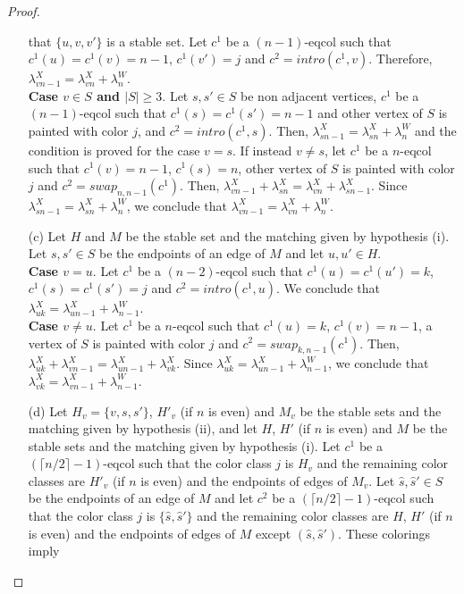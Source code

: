 \begin{proof}
\begin{enumerate}
that  $\{u, v, v'\}$ is a stable set. Let $c^1$ be a $(n-1)$-eqcol such that $c^1(u) = c^1(v) = n-1$, $c^1(v') = j$
and $c^2 = intro(c^1,v)$. Therefore, $\lambda^X_{vn-1} = \lambda^X_{vn} + \lambda^W_n$.\\
\textbf{Case $v \in S$ and $|S| \geq 3$}. Let $s, s' \in S$ be non adjacent vertices,
$c^1$ be a $(n-1)$-eqcol such that $c^1(s) = c^1(s') = n-1$ and other vertex
of $S$ is painted with color $j$, and $c^2 = intro(c^1,s)$.
Then, $\lambda^X_{sn-1} = \lambda^X_{sn} + \lambda^W_n$ and the condition is proved for the case $v = s$.
If instead $v \neq s$, let $c^1$ be a $n$-eqcol such that $c^1(v) = n-1$, $c^1(s) = n$, other vertex of $S$ is
painted with color $j$ and $c^2 = swap_{n,n-1}(c^1)$. Then, 
$\lambda^X_{vn-1} + \lambda^X_{sn} = \lambda^X_{vn} + \lambda^X_{sn-1}$.
Since $\lambda^X_{sn-1} = \lambda^X_{sn} + \lambda^W_n$, we conclude that $\lambda^X_{vn-1} = \lambda^X_{vn} + \lambda^W_n$.
\item[(c)] Let $H$ and $M$ be the stable set and the matching given by hypothesis (i). Let $s, s' \in S$ be
the endpoints of an edge of $M$ and let $u, u' \in H$.\\
\textbf{Case $v = u$}. Let $c^1$ be a $(n-2)$-eqcol such that $c^1(u) = c^1(u') = k$, $c^1(s) = c^1(s') = j$ and
$c^2 = intro(c^1,u)$. We conclude that $\lambda^X_{uk} = \lambda^X_{un-1} + \lambda^W_{n-1}$.\\
\textbf{Case $v \neq u$}. Let $c^1$ be a $n$-eqcol such that $c^1(u) = k$, $c^1(v) = n-1$, a vertex of $S$ is
painted with color $j$ and $c^2 = swap_{k,n-1}(c^1)$. Then,
$\lambda^X_{u k} + \lambda^X_{v n-1} = \lambda^X_{u n-1} + \lambda^X_{vk}$.
Since $\lambda^X_{uk} = \lambda^X_{un-1} + \lambda^W_{n-1}$, we conclude that
$\lambda^X_{vk} = \lambda^X_{vn-1} + \lambda^W_{n-1}$.
\item[(d)] Let $H_v = \{v, s, s'\}$, $H'_v$ (if $n$ is even) and $M_v$ be the stable sets and the matching given
by hypothesis (ii), and let $H$, $H'$ (if $n$ is even) and $M$ be the stable sets and the matching given by hypothesis
(i). Let $c^1$ be a $(\lceil n/2 \rceil - 1)$-eqcol such that the color class $j$ is $H_v$ and the
remaining color classes are $H'_v$ (if $n$ is even) and the endpoints of edges of $M_v$.
Let $\hat{s}, \hat{s}' \in S$ be the endpoints of an edge of $M$ and
let $c^2$ be a $(\lceil n/2 \rceil - 1)$-eqcol such that the color class $j$ is $\{\hat{s}, \hat{s}'\}$ and the
remaining color classes are $H$, $H'$ (if $n$ is even) and the endpoints of edges of $M$ except
$(\hat{s}, \hat{s}')$. These colorings imply

\end{enumerate}
\end{proof}
